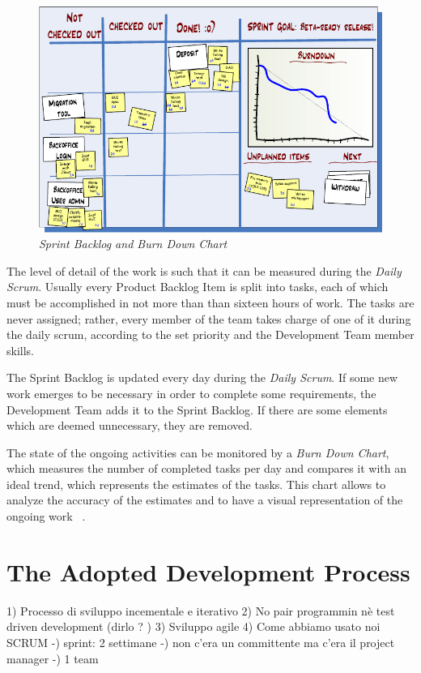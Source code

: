 			\begin{figure}[h]
			  \begin{center} 
			    \includegraphics[scale=0.65]{images/ch_04/task_board_and_chart.png}
			  \end{center} 
			  \caption{\textit{Sprint Backlog and Burn Down Chart}}  
			  \label{fig:SprintBacklog}
		  	\end{figure}

			The level of detail of the work is such that it can be measured during the \emph{Daily Scrum}. Usually every Product Backlog Item is split into tasks, each of which must be accomplished in not more than than sixteen hours of work. The tasks are never assigned; rather, every member of the team takes charge of one of it during the daily scrum, according to the set priority and the Development Team member skills.
	
			The Sprint Backlog is updated every day during the \emph{Daily Scrum}. If some new work emerges to be necessary in order to complete some requirements, the Development Team adds it to the Sprint Backlog. If there are some elements which are deemed unnecessary, they are removed.

			The state of the ongoing activities can be monitored by a \emph{Burn Down Chart}, which measures the number of completed tasks per day and compares it with an ideal trend, which represents the estimates of the tasks. This chart allows to analyze the accuracy of the estimates and to have a visual representation of the ongoing work ~\cite{scrumEnglishGuide}.

					
			
	
	
	\section{The Adopted Development Process}
		1) Processo di sviluppo incementale e iterativo
		2) No pair programmin nè test driven development  (dirlo ? )
		3) Sviluppo agile
		4) Come abbiamo usato noi SCRUM
			-) sprint: 2 settimane
			-) non c'era un committente ma c'era il project manager
			-) 1 team

